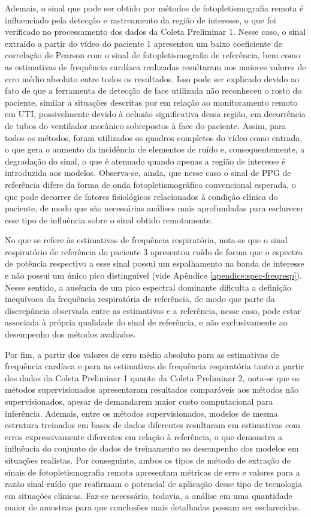 Ademais, o sinal que pode ser obtido por métodos de fotopletismografia remota é influenciado pela detecção e rastreamento da região de interesse, o que foi verificado no processamento dos dados da Coleta Preliminar 1. Nesse caso, o sinal extraído a partir do vídeo do paciente 1 apresentou um baixo coeficiente de correlação de Pearson com o sinal de fotopletismografia de referência, bem como as estimativas de frequência cardíaca realizadas resultaram nos maiores valores de erro médio absoluto entre todos os resultados. Isso pode ser explicado devido ao fato de que a ferramenta de detecção de face utilizada não reconheceu o rosto do paciente, similar a situações descritas por  em relação ao monitoramento remoto em UTI, possivelmente devido à oclusão significativa dessa região, em decorrência de tubos do ventilador mecânico sobrepostos à face do paciente. Assim, para todos os métodos, foram utilizados os quadros completos do vídeo como entrada, o que gera o aumento da incidência de elementos de ruído e, consequentemente, a degradação do sinal, o que é atenuado quando apenas a região de interesse é introduzida aos modelos. Observa-se, ainda, que nesse caso o sinal de PPG de referência difere da forma de onda fotopletismográfica convencional esperada, o que pode decorrer de fatores fisiológicos relacionados à condição clínica do paciente, de modo que são necessárias análises mais aprofundadas para esclarecer esse tipo de influência sobre o sinal obtido remotamente.

No que se refere às estimativas de frequência respiratória, nota-se que o sinal respiratório de referência do paciente 3 apresentou ruído de forma que o espectro de potência respectivo a esse sinal possui um espalhamento na banda de interesse e não possui um único pico distinguível (vide Apêndice \ref{apendice:spec-freqresp}). Nesse sentido, a ausência de um pico espectral dominante dificulta a definição inequívoca da frequência respiratória de referência, de modo que parte da discrepância observada entre as estimativas e a referência, nesse caso, pode estar associada à própria qualidade do sinal de referência, e não exclusivamente ao desempenho dos métodos avaliados.

Por fim, a partir dos valores de erro médio absoluto para as estimativas de frequência cardíaca e para as estimativas de frequência respiratória tanto a partir dos dados da Coleta Preliminar 1 quanto da Coleta Preliminar 2, nota-se que os métodos supervisionados apresentaram resultados comparáveis aos métodos não supervisionados, apesar de demandarem maior custo computacional para inferência. Ademais, entre os métodos supervisionados, modelos de mesma estrutura treinados em bases de dados diferentes resultaram em estimativas com erros expressivamente diferentes em relação à referência, o que demonstra a influência do conjunto de dados de treinamento no desempenho dos modelos em situações realistas. Por conseguinte, ambos os tipos de método de extração de sinais de fotopletismografia remota apresentam métricas de erro e valores para a razão sinal-ruído que reafirmam o potencial de aplicação desse tipo de tecnologia em situações clínicas. Faz-se necessário, todavia, a análise em uma quantidade maior de amostras para que conclusões mais detalhadas possam ser esclarecidas. 

